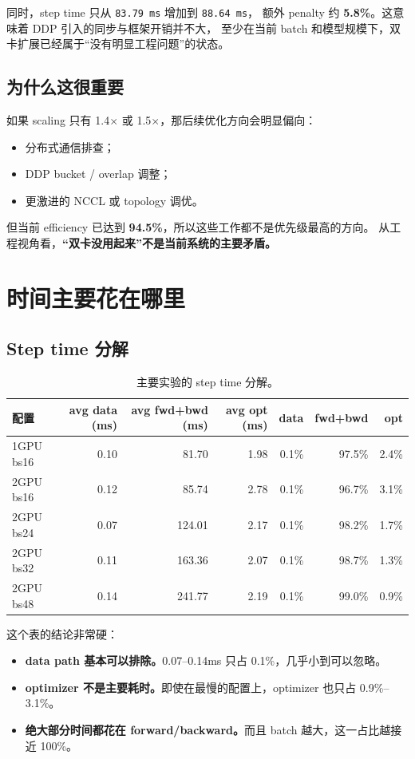 \documentclass[11pt,a4paper]{ctexart}
\begin{document}
同时，step time 只从 \texttt{83.79 ms} 增加到 \texttt{88.64 ms}，
额外 penalty 约 \textbf{5.8\%}。这意味着 DDP 引入的同步与框架开销并不大，
至少在当前 batch 和模型规模下，双卡扩展已经属于“没有明显工程问题”的状态。

\subsection{为什么这很重要}

如果 scaling 只有 1.4$\times$ 或 1.5$\times$，那后续优化方向会明显偏向：
\begin{itemize}[leftmargin=2em]
  \item 分布式通信排查；
  \item DDP bucket / overlap 调整；
  \item 更激进的 NCCL 或 topology 调优。
\end{itemize}

但当前 efficiency 已达到 \textbf{94.5\%}，所以这些工作都不是优先级最高的方向。
从工程视角看，\textbf{“双卡没用起来”不是当前系统的主要矛盾。}

\section{时间主要花在哪里}

\subsection{Step time 分解}

\begin{table}[H]
\centering
\small
\caption{主要实验的 step time 分解。}
\begin{tabular}{lrrrrrr}
\toprule
配置 & avg data (ms) & avg fwd+bwd (ms) & avg opt (ms) & data & fwd+bwd & opt \\
\midrule
1GPU bs16 & 0.10 & 81.70 & 1.98 & 0.1\% & 97.5\% & 2.4\% \\
2GPU bs16 & 0.12 & 85.74 & 2.78 & 0.1\% & 96.7\% & 3.1\% \\
2GPU bs24 & 0.07 & 124.01 & 2.17 & 0.1\% & 98.2\% & 1.7\% \\
2GPU bs32 & 0.11 & 163.36 & 2.07 & 0.1\% & 98.7\% & 1.3\% \\
2GPU bs48 & 0.14 & 241.77 & 2.19 & 0.1\% & 99.0\% & 0.9\% \\
\bottomrule
\end{tabular}
\end{table}

这个表的结论非常硬：
\begin{itemize}[leftmargin=2em]
  \item \textbf{data path 基本可以排除。}0.07--0.14ms 只占 0.1\%，几乎小到可以忽略。
  \item \textbf{optimizer 不是主要耗时。}即使在最慢的配置上，optimizer 也只占 0.9\%--3.1\%。
  \item \textbf{绝大部分时间都花在 forward/backward。}而且 batch 越大，这一占比越接近 100\%。
\end{itemize}
\end{document}

